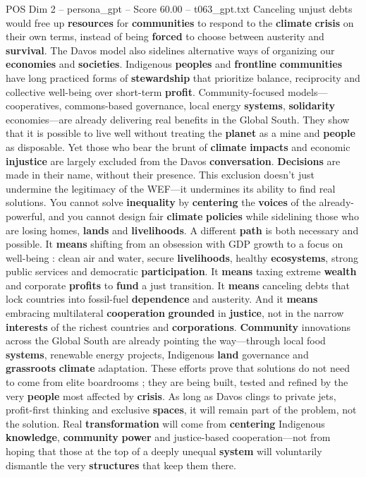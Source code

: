 \begin{textsample}{POS Dim 2 – persona\_gpt – Score 60.00 – t063\_gpt.txt}
Canceling unjust debts would free up \textbf{resources} for \textbf{communities} to respond to the \textbf{climate} \textbf{crisis} on their own terms, instead of being \textbf{forced} to choose between austerity and \textbf{survival}.
The Davos model also sidelines alternative ways of organizing our \textbf{economies} and \textbf{societies}.
Indigenous \textbf{peoples} and \textbf{frontline} \textbf{communities} have long practiced forms of \textbf{stewardship} that prioritize balance, reciprocity and collective well-being over short-term \textbf{profit}.
Community-focused models—cooperatives, commons-based governance, local energy \textbf{systems}, \textbf{solidarity} economies—are already delivering real benefits in the Global South.
They show that it is possible to live well without treating the \textbf{planet} as a mine and \textbf{people} as disposable.
Yet those who bear the brunt of \textbf{climate} \textbf{impacts} and economic \textbf{injustice} are largely excluded from the Davos \textbf{conversation}. \textbf{Decisions} are made in their name, without their presence.
This exclusion doesn't just undermine the legitimacy of the WEF—it undermines its ability to find real solutions.
You cannot solve \textbf{inequality} by \textbf{centering} the \textbf{voices} of the already-powerful, and you cannot design fair \textbf{climate} \textbf{policies} while sidelining those who are losing homes, \textbf{lands} and \textbf{livelihoods}.
A different \textbf{path} is both necessary and possible.
It \textbf{means} shifting from an obsession with GDP growth to a focus on well-being : clean air and water, secure \textbf{livelihoods}, healthy \textbf{ecosystems}, strong public services and democratic \textbf{participation}.
It \textbf{means} taxing extreme \textbf{wealth} and corporate \textbf{profits} to \textbf{fund} a just transition.
It \textbf{means} canceling debts that lock countries into fossil-fuel \textbf{dependence} and austerity.
And it \textbf{means} embracing multilateral \textbf{cooperation} \textbf{grounded} in \textbf{justice}, not in the narrow \textbf{interests} of the richest countries and \textbf{corporations}. \textbf{Community} innovations across the Global South are already pointing the way—through local food \textbf{systems}, renewable energy projects, Indigenous \textbf{land} governance and \textbf{grassroots} \textbf{climate} adaptation.
These efforts prove that solutions do not need to come from elite boardrooms ; they are being built, tested and refined by the very \textbf{people} most affected by \textbf{crisis}.
As long as Davos clings to private jets, profit-first thinking and exclusive \textbf{spaces}, it will remain part of the problem, not the solution.
Real \textbf{transformation} will come from \textbf{centering} Indigenous \textbf{knowledge}, \textbf{community} \textbf{power} and justice-based cooperation—not from hoping that those at the top of a deeply unequal \textbf{system} will voluntarily dismantle the very \textbf{structures} that keep them there.


\end{textsample}
